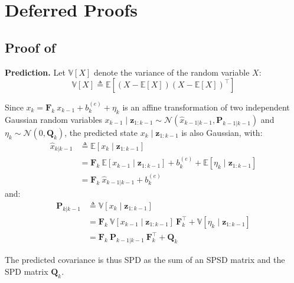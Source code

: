 \chapter{Deferred Proofs}

\vfill
\localtableofcontents
\vfill
\newpage

\section[Proof of Proposition 2.3]{Proof of }\label{sec:proof_Kalman}

\textbf{Prediction.} Let $\mathbb{V}[X]$ denote the variance of the random variable $X$:
\begin{equation}
	\mathbb{V}[X]\triangleq\mathbb{E}\left[(X-\mathbb{E}[X])(X-\mathbb{E}[X])^\top\right]
\end{equation}

Since $x_k=\mathbf{F}_k\:x_{k-1}+b_k^{(e)}+\eta_k$ is an affine transformation of two independent Gaussian random variables $x_{k-1}\mid\mathbf{z}_{1:k-1}\sim\mathcal{N}\left(\hat{x}_{k-1|k-1},\mathbf{P}_{k-1|k-1}\right)$ and $\eta_k\sim\mathcal{N}(0,\mathbf{Q}_k)$, the predicted state $x_k\mid\mathbf{z}_{1:k-1}$ is also Gaussian, with:
\begin{equation}
	\begin{aligned}
	\hat{x}_{k|k-1}&\triangleq\mathbb{E}[x_k\mid\mathbf{z}_{1:k-1}]\\
	&=\mathbf{F}_k\:\mathbb{E}[x_{k-1}\mid\mathbf{z}_{1:k-1}]+b_k^{(e)}+\mathbb{E}[\eta_k\mid\mathbf{z}_{1:k-1}]\\
	&=\mathbf{F}_k\:\hat{x}_{k-1|k-1}+b_k^{(e)}
	\end{aligned}
\end{equation}
and:
\begin{equation}
	\begin{aligned}
	\mathbf{P}_{k|k-1}&\triangleq\mathbb{V}[x_k\mid\mathbf{z}_{1:k-1}]\\
	&=\mathbf{F}_k\:\mathbb{V}[x_{k-1}\mid\mathbf{z}_{1:k-1}]\:\mathbf{F}_k^\top+\mathbb{V}[\eta_k\mid\mathbf{z}_{1:k-1}]\\
	&=\mathbf{F}_k\:\mathbf{P}_{k-1|k-1}\:\mathbf{F}_k^\top+\mathbf{Q}_k
	\end{aligned}
\end{equation}

The predicted covariance is thus SPD as the sum of an SPSD matrix and the SPD matrix $\mathbf{Q}_k$.


